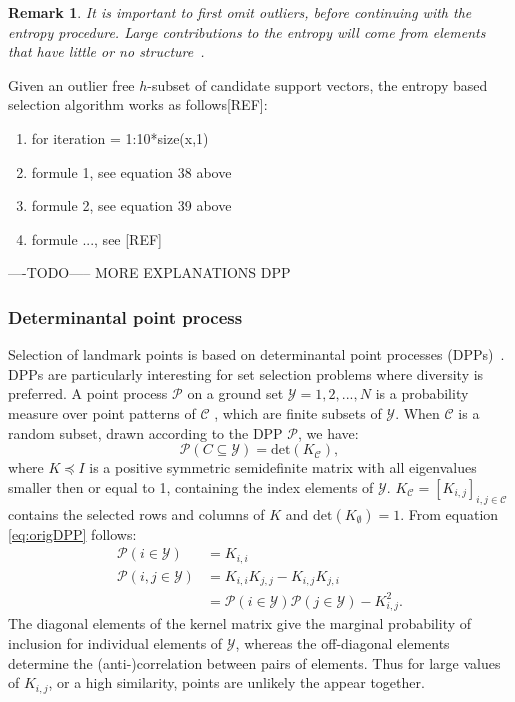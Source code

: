 \documentclass[preprint,12pt]{elsarticle}
\newtheorem*{remark}{Remark}
\begin{document}
\begin{remark}
	It is important to first omit outliers, before continuing with the entropy procedure. Large contributions to the entropy will come from elements that have little or no structure~\cite{girolami2002orthogonal}.
\end{remark}

Given an outlier free $h$-subset of candidate support vectors, the entropy based selection algorithm works as follows[REF]:
\begin{enumerate}
	\item for iteration = 1:10*size(x,1)
	\item formule 1, see equation 38 above
	\item formule 2, see equation 39 above
	\item formule ..., see [REF]
\end{enumerate}

----TODO-----
MORE EXPLANATIONS DPP


\subsubsection{Determinantal point process}
Selection of landmark points is based on determinantal point processes (DPPs)~\cite{kulesza2012determinantal}. DPPs are particularly interesting for set selection problems where diversity is preferred. A point process $\mathcal{P}$ on a ground set $\mathcal{Y} = {1,2,...,N}$ is a probability measure over point patterns of $\mathcal{C}$ , which are finite subsets of $\mathcal{Y}$. When $\mathcal{C}$ is a random subset, drawn according to the DPP $\mathcal{P}$, we have:
\begin{equation}
\label{eq:origDPP}
	\mathcal{P}(C \subseteq \mathcal{Y}) = \mathrm{det}(K_{\mathcal{C}}),
\end{equation}
where $K \preceq I$ is a positive symmetric semidefinite matrix with all eigenvalues smaller then or equal to 1, containing the index elements of $\mathcal{Y}$. $K_{\mathcal{C}} = [K_{i,j}]_{i,j \in \mathcal{C}}$ contains the selected rows and columns of $K$ and $\mathrm{det}(K_{\emptyset}) = 1$. From equation \eqref{eq:origDPP} follows:
\begin{align}
	\mathcal{P}(i \in \mathcal{Y}) &= K_{i,i} \\
	\mathcal{P}(i,j \in \mathcal{Y}) &= K_{i,i}K_{j,j} - K_{i,j}K_{j,i}\\
	\label{eq:KDPP}
	&= \mathcal{P}(i \in \mathcal{Y})\mathcal{P}(j \in \mathcal{Y}) - K_{i,j}^2.
\end{align}
The diagonal elements of the kernel matrix give the marginal probability of inclusion for individual elements of $\mathcal{Y}$, whereas the off-diagonal elements determine the (anti-)correlation between pairs of elements. Thus for large values of $K_{i,j}$, or a high similarity, points are unlikely the appear together. 
\end{document}

